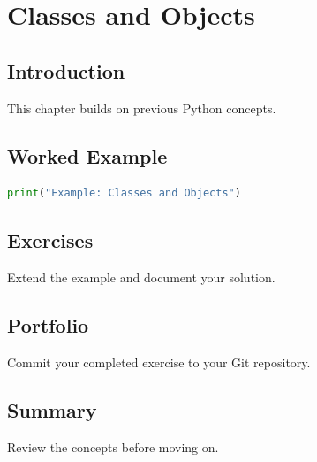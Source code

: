 \chapter{Classes and Objects}
\label{chap:vol3-16}



\section{Introduction}
This chapter builds on previous Python concepts.

\section{Worked Example}
\begin{lstlisting}[language=Python]
print("Example: Classes and Objects")
\end{lstlisting}

\section{Exercises}
\begin{exercise}
Extend the example and document your solution.
\end{exercise}

\section{Portfolio}
Commit your completed exercise to your Git repository.

\section{Summary}
Review the concepts before moving on.
